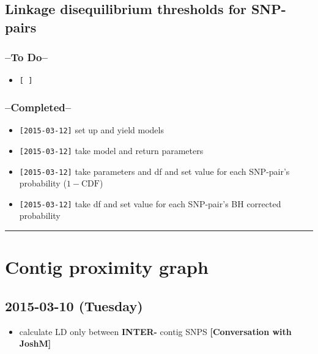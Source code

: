 \documentclass[letterpaper]{scrartcl}
\begin{document}
\subsection{Linkage disequilibrium thresholds for
SNP-pairs}\label{linkage-disequilibrium-thresholds-for-snp-pairs}

\subsubsection{--To Do--}\label{to-do-1}

\begin{itemize}
\itemsep1pt\parskip0pt
\item
  \texttt{{[} {]}}
\end{itemize}

\subsubsection{--Completed--}\label{completed-1}

\begin{itemize}
\itemsep1pt\parskip0pt
\item
  \texttt{{[}2015-03-12{]}} set up and yield models
\item
  \texttt{{[}2015-03-12{]}} take model and return parameters
\item
  \texttt{{[}2015-03-12{]}} take parameters and df and set value for
  each SNP-pair's probability (\(1-\mathrm{CDF}\))
\item
  \texttt{{[}2015-03-12{]}} take df and set value for each SNP-pair's BH
  corrected probability
\end{itemize}

\begin{center}\rule{0.5\linewidth}{\linethickness}\end{center}

\newpage

\section{Contig proximity graph}\label{contig-proximity-graph}

\subsection{2015-03-10 (Tuesday)}\label{tuesday}

\begin{itemize}
\itemsep1pt\parskip0pt
\item
  calculate LD only between \textbf{INTER-} contig SNPS
  \textbf{{[}Conversation with JoshM{]}}
\end{itemize}
\end{document}
